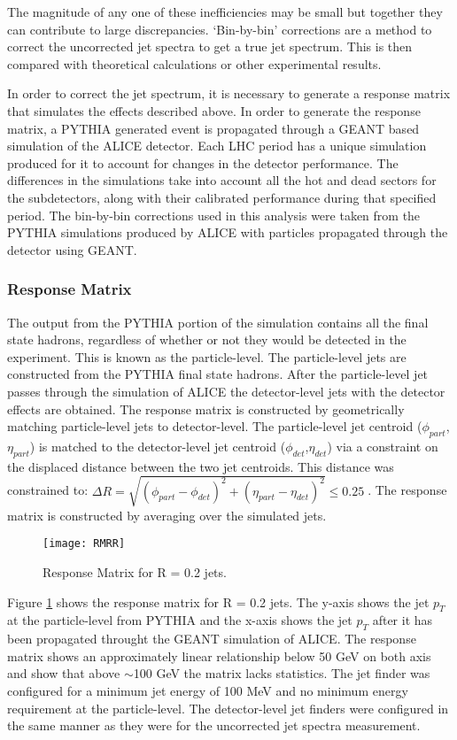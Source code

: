 \noindent
The magnitude of any one of these inefficiencies may be small but together they can contribute to large discrepancies.  `Bin-by-bin' corrections are a method to correct the uncorrected jet spectra to get a true jet spectrum.  This is then compared with theoretical calculations or other experimental results.

In order to correct the jet spectrum, it is necessary to generate a response matrix that simulates the effects described above.  In order to generate the response matrix, a PYTHIA generated event is propagated through a GEANT based simulation of the ALICE detector.  Each LHC period has a unique simulation produced for it to account for changes in the detector performance.  The differences in the simulations take into account all the hot and dead sectors for the subdetectors, along with their calibrated performance during that specified period.  The bin-by-bin corrections used in this analysis were taken from the PYTHIA simulations produced by ALICE with particles propagated through the detector using GEANT.

\subsubsection{Response Matrix}
The output from the PYTHIA portion of the simulation contains all the final state hadrons, regardless of whether or not they would be detected in the experiment.  This is known as the particle-level.  The particle-level jets are constructed from the PYTHIA final state hadrons.  After the particle-level jet passes through the simulation of ALICE the detector-level jets with the detector effects are obtained.
The response matrix is constructed by geometrically matching particle-level jets to detector-level.  The particle-level jet centroid ($\phi_{part}$,$\eta_{part}$) is matched to the detector-level jet centroid ($\phi_{det}$,$\eta_{det}$) via a constraint on the displaced distance between the two jet centroids.  This distance was constrained to: $\Delta  R = \sqrt{(\phi_{part} - \phi_{det})^{2} + (\eta_{part} - \eta_{det})^{2}} \leq 0.25 \; $.  The response matrix is constructed by averaging over the simulated jets.

\begin{figure}[b!]
\texttt{[image: RMRR]}
\centering
\caption{Response Matrix for R = 0.2 jets.}
\label{fig:response}
\end{figure}

Figure \ref{fig:response} shows the response matrix for R = 0.2 jets.  The y-axis shows the jet $p_{T}$ at the particle-level from PYTHIA and the x-axis shows the jet $p_{T}$ after it has been propagated throught the GEANT simulation of ALICE.  The response matrix shows an approximately linear relationship below 50 GeV on both axis and show that above $\sim$100 GeV the matrix lacks statistics.  The jet finder was configured for a minimum jet energy of 100 MeV and no minimum energy requirement at the particle-level.  The detector-level jet finders were configured in the same manner as they were for the uncorrected jet spectra measurement.

